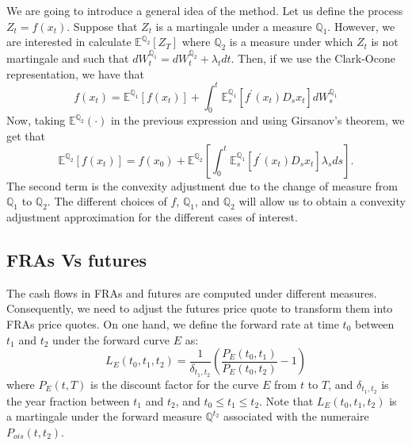 \documentclass[a4paper,10pt]{article}
\newcommand{\1}{\mathbf{1}}
\begin{document}
We are going to introduce a general idea of the method. Let us define the process $Z_t = f(x_t)$. Suppose that $Z_t$ is a martingale under a measure $\mathbb{Q}_1$. However, we are interested in calculate $\mathbb{E}^{\mathbb{Q}_2}\left[Z_T \right]$ where $\mathbb{Q}_2$ is a measure under which $Z_t$ is not martingale and such that $dW^{\mathbb{Q}_1}_t = dW^{\mathbb{Q}_2}_t +\lambda_t dt$. Then, if we use the Clark-Ocone representation, we have that
\begin{equation*}
f(x_t) = \mathbb{E}^{\mathbb{Q}_1}\left[f(x_t)\right] + \int_{0}^{t} \mathbb{E}^{\mathbb{Q}_1}_s\left[ f^{\prime}(x_t) D_s x_t  \right] dW^{\mathbb{Q}_1}_s
\end{equation*}
Now, taking $\mathbb{E}^{\mathbb{Q}_2}\left( \cdot \right)$ in the previous expression and using Girsanov's theorem, we get that
\begin{equation}\label{general_convexity}
\mathbb{E}^{\mathbb{Q}_2}\left[ f(x_t) \right] = f(x_0) + \mathbb{E}^{\mathbb{Q}_2} \left[\int_{0}^{t}  \mathbb{E}^{\mathbb{Q}_1}_s\left[ f^{\prime}(x_t) D_s x_t  \right] \lambda_s ds \right]. 
\end{equation}
The second term is the convexity adjustment due to the change of measure from $\mathbb{Q}_1$ to $\mathbb{Q}_2$. The different choices of $f$, $\mathbb{Q}_1$, and $\mathbb{Q}_2$ will allow us to obtain a convexity adjustment approximation for the different cases of interest. 

\subsection{FRAs Vs futures}
The cash flows in FRAs and futures are computed under different measures. Consequently, we need to adjust the futures price quote to transform them into FRAs price quotes. On one hand, we define the forward rate at time $t_0$ between $t_1$ and $t_2$ under the forward curve $E$ as:
\begin{equation}\label{forward_rate}
L_{E}(t_0, t_1, t_2) = \frac{1}{\delta_{t_1,t_2}}\left(\frac{P_{E}(t_0,t_1)}{P_{E}(t_0,t_2)} - 1 \right)
\end{equation} 
where $P_{E}(t,T)$ is the discount factor for the curve $E$ from $t$ to $T$, and $\delta_{t_1,t_2}$ is the year fraction between $t_1$ and $t_2$, and $t_{0}\leq t_{1} \leq t_{2}$. Note that $L_{E}(t_0, t_1, t_2)$ is a martingale under the forward measure $\mathbb{Q}^{t_2}$ associated with the numeraire $P_{ois}(t,t_2)$.\\
\end{document}
